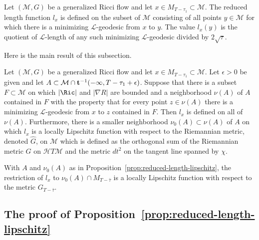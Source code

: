 \begin{definition}\label{def:reduced-length-domain}
Let $({\mathcal M},G)$ be a generalized Ricci flow and let $x\in
M_{T-\tau_1}\subset {\mathcal M}$. The reduced length function $l_x$ is defined
on the subset of ${\mathcal M}$ consisting of all points $y\in {\mathcal M}$
for which there is a minimizing ${\mathcal L}$-geodesic from $x$ to $y$. The
value $l_x(y)$ is the quotient of ${\mathcal L}$-length of any such minimizing
${\mathcal L}$-geodesic divided by $2\sqrt{\tau}$.
\end{definition}

Here is the main result of this subsection.

\begin{proposition}\label{prop:reduced-length-lipschitz}
\label{lips}
Let $({\mathcal M},G)$ be a generalized Ricci flow and let $x\in
M_{T-\tau_1}\subset {\mathcal M}$. Let $\epsilon>0$ be given and let $A\subset
{\mathcal M}\cap {\bf t}^{-1}(-\infty,T-\tau_1+\epsilon)$. Suppose that there
is a subset $F\subset {\mathcal M}$ on which $|\Ric|$ and $|\nabla R|$ are
bounded and a neighborhood $\nu(A)$ of $A$ contained in $F$ with the property
that for every point $z\in \nu(A)$ there is a minimizing ${\mathcal
L}$-geodesic from $x$ to $z$ contained in $F$. Then $l_x$ is defined on  all of
$\nu(A)$. Furthermore, there is a smaller neighborhood $\nu_0(A)\subset \nu(A)$
of $A$ on which $l_x$ is a locally Lipschitz function with respect to the
Riemannian metric, denoted $\widehat G$, on ${\mathcal M}$ which is defined as
the orthogonal sum of the Riemannian metric $G$ on ${\mathcal H}T{\mathcal M}$
and the metric $dt^2$ on the tangent line spanned by $\chi$.
\end{proposition}







\begin{corollary}\label{cor:reduced-length-lipschitz-time-slice}
With $A$ and $\nu_0(A)$ as in Proposition~\ref{prop:reduced-length-lipschitz}, the
restriction of $l_x$ to  $\nu_0(A)\cap M_{T-\bar\tau}$ is a locally
Lipschitz function with respect to the metric $G_{T-\bar\tau}$.
\end{corollary}


\subsection{The proof of Proposition~{\ref{prop:reduced-length-lipschitz}}}

